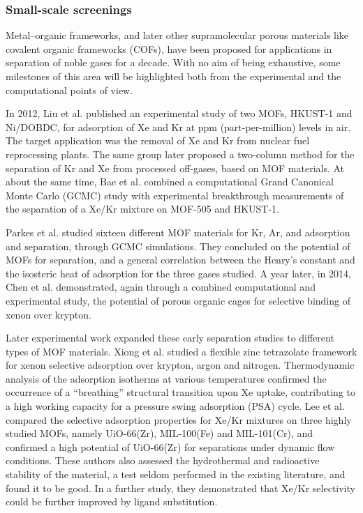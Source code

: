 \documentclass[main.tex]{subfiles}
\begin{document}
\subsubsection{Small-scale screenings}

Metal--organic frameworks, and later other supramolecular porous materials like covalent organic frameworks (COFs), have been proposed for applications in separation of noble gases for a decade. With no aim of being exhaustive, some milestones of this area will be highlighted both from the experimental and the computational points of view.

In 2012, Liu et al.\autocite{Liu_2012} published an experimental study of two MOFs, HKUST-1 and Ni/DOBDC, for adsorption of Xe and Kr at ppm (part-per-million) levels in air. The target application was the removal of Xe and Kr from nuclear fuel reprocessing plants. The same group later proposed a two-column method for the separation of Kr and Xe from processed off-gases\autocite{Liu_2014}, based on MOF materials. At about the same time, Bae et al.\autocite{Bae_2013} combined a computational Grand Canonical Monte Carlo (GCMC) study with experimental breakthrough measurements of the separation of a Xe/Kr mixture on MOF-505 and HKUST-1.

Parkes et al.\autocite{Parkes_2013} studied sixteen different MOF materials for Kr, Ar, and  adsorption and separation, through GCMC simulations. They concluded on the potential of MOFs for separation, and a general correlation between the Henry's constant and the isosteric heat of adsorption for the three gases studied. A year later, in 2014, Chen et al.\autocite{Chen_2014} demonstrated, again through a combined computational and experimental study, the potential of porous organic cages for selective binding of xenon over krypton.

Later experimental work expanded these early separation studies to different types of MOF materials. Xiong et al.\autocite{Xiong_2015} studied a flexible zinc tetrazolate framework for xenon selective adsorption over krypton, argon and nitrogen. Thermodynamic analysis of the adsorption isotherms at various temperatures confirmed the occurrence of a ``breathing'' structural transition upon Xe uptake, contributing to a high working capacity for a pressure swing adsorption (PSA) cycle. Lee et al.\autocite{Lee_2016} compared the selective adsorption properties for Xe/Kr mixtures on three highly studied MOFs, namely UiO-66(Zr), MIL-100(Fe) and MIL-101(Cr), and confirmed a high potential of UiO-66(Zr) for separations under dynamic flow conditions. These authors also assessed the hydrothermal and radioactive stability of the material, a test seldom performed in the existing literature, and found it to be good. In a further study,\autocite{Lee_2018} they demonstrated that Xe/Kr selectivity could be further improved by ligand substitution.
\end{document}
